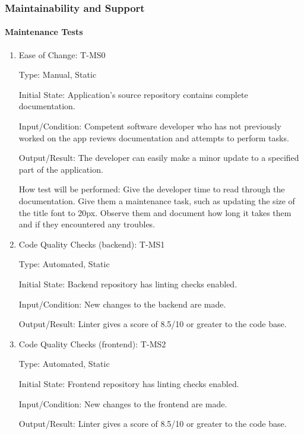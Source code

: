 \documentclass[12pt, titlepage]{article}
\begin{document}
\subsubsection{Maintainability and Support}
		
\paragraph{Maintenance Tests}

\begin{enumerate}

\item{Ease of Change: T-MS0\\}

Type: Manual, Static
					
Initial State: Application's source repository contains complete documentation.
					
Input/Condition: Competent software developer who has not previously worked on the app reviews documentation and attempts to perform tasks.
					
Output/Result: The developer can easily make a minor update to a specified part of the application.
					
How test will be performed: Give the developer time to read through the documentation. Give them a maintenance task, such as updating the size of the title font to 20px. Observe them and document how long it takes them and if they encountered any troubles.

\item{Code Quality Checks (backend): T-MS1\\}

Type: Automated, Static
					
Initial State: Backend repository has linting checks enabled.
					
Input/Condition: New changes to the backend are made.
					
Output/Result: Linter gives a score of 8.5/10 or greater to the code base.

\item{Code Quality Checks (frontend): T-MS2\\}

Type: Automated, Static
					
Initial State: Frontend repository has linting checks enabled.
					
Input/Condition: New changes to the frontend are made.
					
Output/Result: Linter gives a score of 8.5/10 or greater to the code base.
					

\end{enumerate}
\end{document}
